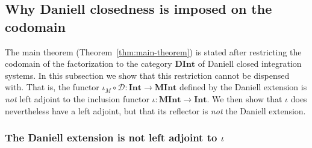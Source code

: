 \subsection{Why Daniell closedness is imposed on the codomain}\label{sec:why-complete}

The main theorem (Theorem~\ref{thm:main-theorem}) is stated after restricting the
codomain of the factorization to the category $\mathbf{DInt}$ of Daniell closed
integration systems.
In this subsection we show that this restriction cannot be dispensed with.
That is, the functor $\iota_M\circ\mathcal{D}:\mathbf{Int}\to\mathbf{MInt}$
defined by the Daniell extension is \emph{not} left adjoint to the inclusion
functor $\iota:\mathbf{MInt}\to\mathbf{Int}$.
We then show that $\iota$ does nevertheless have a left adjoint, but that its
reflector is \emph{not} the Daniell extension.

\subsubsection{The Daniell extension is not left adjoint to $\iota$}

